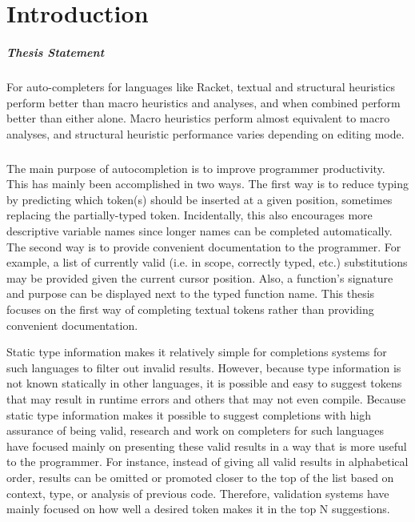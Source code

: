 \documentclass[ms,electronic,twosidetoc,letterpaper,chaptercenter,parttop,lol,lof,lot]{byumsphd}
\title{\Title}
\author{\Author}
\begin{document}
\maketitle
{}

\chapter{Introduction}

\paragraph{Thesis Statement} For auto-completers for languages like Racket, textual and structural heuristics perform better than macro heuristics and analyses, and when combined perform better than either alone.
Macro heuristics perform almost equivalent to macro analyses, and structural heuristic performance varies depending on editing mode.

\paragraph{} The main purpose of autocompletion is to improve programmer productivity.
This has mainly been accomplished in two ways.
The first way is to reduce typing by predicting which token(s) should be inserted at a given position, sometimes replacing the partially-typed token.
Incidentally, this also encourages more descriptive variable names since longer names can be completed automatically.
The second way is to provide convenient documentation to the programmer.
For example, a list of currently valid (i.e. in scope, correctly typed, etc.) substitutions may be provided given the current cursor position.
Also, a function's signature and purpose can be displayed next to the typed function name.
This thesis focuses on the first way of completing textual tokens rather than providing convenient documentation.

Static type information makes it relatively simple for completions systems for such languages to filter out invalid results.
However, because type information is not known statically in other languages, it is possible and easy to suggest tokens that may result in runtime errors and others that may not even compile.
Because static type information makes it possible to suggest completions with high assurance of being valid, research and work on completers for such languages have focused mainly on presenting these valid results in a way that is more useful to the programmer.
For instance, instead of giving all valid results in alphabetical order, results can be omitted or promoted closer to the top of the list based on context, type, or analysis of previous code.
Therefore, validation systems have mainly focused on how well a desired token makes it in the top N suggestions.
\end{document}
